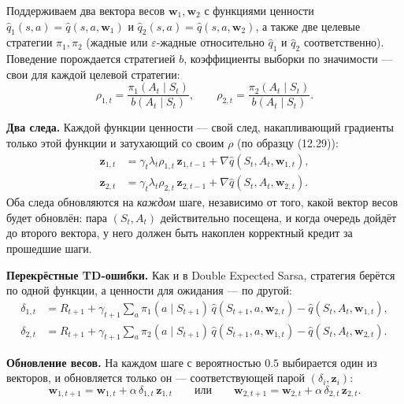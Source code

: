 \begin{solution}
    Поддерживаем два вектора весов $\mathbf w_1,\mathbf w_2$ с функциями ценности
    $\hat q_1(s,a)=\hat q(s,a,\mathbf w_1)$ и $\hat q_2(s,a)=\hat q(s,a,\mathbf w_2)$,
    а также две целевые стратегии $\pi_1,\pi_2$ (жадные или $\varepsilon$-жадные
    относительно $\hat q_1$ и $\hat q_2$ соответственно). Поведение порождается
    стратегией $b$, коэффициенты выборки по значимости --- свои для каждой целевой
    стратегии:
    \begin{equation*}
        \rho_{1,t} = \frac{\pi_1(A_t\mid S_t)}{b(A_t\mid S_t)}, \qquad
        \rho_{2,t} = \frac{\pi_2(A_t\mid S_t)}{b(A_t\mid S_t)}.
    \end{equation*}

    \textbf{Два следа.} Каждой функции ценности --- свой след, накапливающий
    градиенты только этой функции и затухающий со своим $\rho$ (по образцу (12.29)):
    \begin{align*}
        \mathbf z_{1,t} &= \gamma_t\lambda_t\rho_{1,t}\,\mathbf z_{1,t-1} + \nabla\hat q(S_t,A_t,\mathbf w_{1,t}),\\
        \mathbf z_{2,t} &= \gamma_t\lambda_t\rho_{2,t}\,\mathbf z_{2,t-1} + \nabla\hat q(S_t,A_t,\mathbf w_{2,t}).
    \end{align*}
    Оба следа обновляются на \emph{каждом} шаге, независимо от того, какой вектор
    весов будет обновлён: пара $(S_t,A_t)$ действительно посещена, и когда очередь
    дойдёт до второго вектора, у него должен быть накоплен корректный кредит за
    прошедшие шаги.

    \textbf{Перекрёстные TD-ошибки.} Как и в Double Expected Sarsa, стратегия
    берётся по одной функции, а ценности для ожидания --- по другой:
    \begin{align*}
        \delta_{1,t} &= R_{t+1} + \gamma_{t+1}\sum_a \pi_1(a\mid S_{t+1})\,\hat q(S_{t+1},a,\mathbf w_{2,t}) - \hat q(S_t,A_t,\mathbf w_{1,t}),\\
        \delta_{2,t} &= R_{t+1} + \gamma_{t+1}\sum_a \pi_2(a\mid S_{t+1})\,\hat q(S_{t+1},a,\mathbf w_{1,t}) - \hat q(S_t,A_t,\mathbf w_{2,t}).
    \end{align*}

    \textbf{Обновление весов.} На каждом шаге с вероятностью $0.5$ выбирается один
    из векторов, и обновляется только он --- соответствующей парой
    $(\delta_i,\mathbf z_i)$:
    \begin{equation*}
        \mathbf w_{1,t+1} = \mathbf w_{1,t} + \alpha\,\delta_{1,t}\,\mathbf z_{1,t}
        \qquad\text{или}\qquad
        \mathbf w_{2,t+1} = \mathbf w_{2,t} + \alpha\,\delta_{2,t}\,\mathbf z_{2,t}.
    \end{equation*}


\end{solution}
